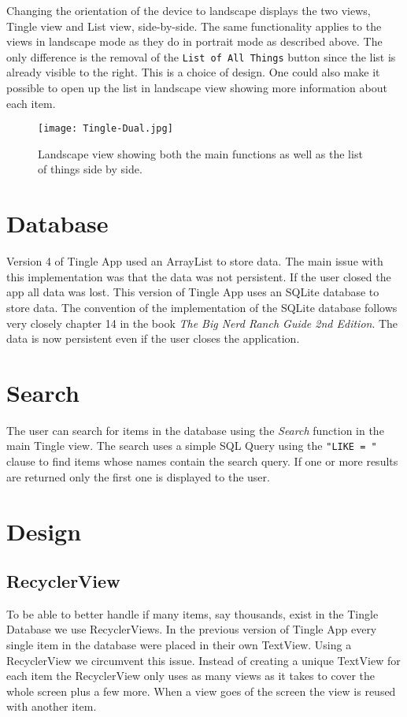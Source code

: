 \pagebreak
Changing the orientation of the device to landscape displays the two views, Tingle view and List view, side-by-side. The same functionality applies to the views in landscape mode as they do in portrait mode as described above. The only difference is the removal of the \texttt{List of All Things} button since the list is already visible to the right. This is a choice of design. One could also make it possible to open up the 
list in landscape view showing more information about each item.

\begin{figure}[H]
	\centering
	\texttt{[image: Tingle-Dual.jpg]}
	\caption{Landscape view showing both the main functions as well as the list of things side by side.}
	\label{fig:landscape-main-view}
\end{figure}

\section{Database}
Version 4 of Tingle App used an ArrayList to store data. The main issue with this implementation was that the data was not persistent. If the user closed the app all data was lost. This version of Tingle App uses an SQLite database to store data. The convention of the implementation of the SQLite database follows very closely chapter 14 in the book \emph{The Big Nerd Ranch Guide 2nd Edition}. The data is now persistent even if the user closes the application.

\section{Search}
The user can search for items in the database using the \emph{Search} function in the main Tingle view. The search uses a simple SQL Query using the \texttt{"LIKE = "} clause to find items whose names contain the search query. If one or more results are returned only the first one is displayed to the user.

\section{Design}
\subsection{RecyclerView}
To be able to better handle if many items, say thousands, exist in the Tingle Database we use RecyclerViews. In the previous version of Tingle App every single item in the database were placed in their own TextView. Using a RecyclerView we circumvent this issue. Instead of creating a unique TextView for each item the RecyclerView only uses as many views as it takes to cover the whole screen plus a few more. When a view goes of the screen the view is reused with another item.

